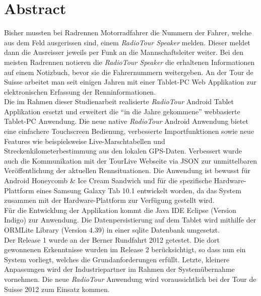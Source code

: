 \chapter*{Abstract}

Bisher mussten bei Radrennen Motorradfahrer die Nummern der Fahrer, welche aus dem Feld ausgerissen sind, einem \textit{RadioTour Speaker} melden. Dieser meldet dann die Ausreisser jeweils per Funk an die Mannschaftsleiter weiter. Bei den meisten Radrennen notieren die \textit{RadioTour Speaker} die erhaltenen Informationen auf einem Notizbuch, bevor sie die Fahrernummern weitergeben. An der Tour de Suisse arbeitet man seit einigen Jahren mit einer Tablet-PC Web Applikation zur elektronischen Erfassung der Renninformationen.
\\
Die im Rahmen dieser Studienarbeit realisierte \textit{RadioTour} Android Tablet Applikation ersetzt und erweitert die "`in die Jahre gekommene"' webbasierte Tablet-PC Anwendung. Die neue native \textit{RadioTour} Android Anwendung bietet eine einfachere Touchscreen Bedienung, verbesserte Importfunktionen sowie neue Features wie beispielsweise Live-Marschtabellen und Streckenkilometerbestimmung aus den lokalen GPS-Daten. Verbessert wurde auch die Kommunikation mit der TourLive Webseite via JSON zur unmittelbaren Veröffentlichung der aktuellen Rennsituationen. Die Anwendung ist bewusst für Android Honeycomb \& Ice Cream Sandwich und für die  spezifische Hardware-Plattform eines Samsung Galaxy Tab 10.1 entwickelt worden, da das System zusammen mit der Hardware-Plattform zur Verfügung gestellt wird.
\\
Für die Entwicklung der Applikation kommt die Java IDE Eclipse (Version Indigo) zur Anwendung. Die Datenpersistierung auf dem Tablet wird mithilfe der ORMLite Library (Version 4.39) in einer \gls{sqlite} Datenbank umgesetzt.
\\
Der Release 1 wurde an der Berner Rundfahrt 2012 getestet. Die dort gewonnenen Erkenntnisse wurden im Release 2 berücksichtigt, so dass nun ein System vorliegt, welches die Grundanforderungen erfüllt. Letzte, kleinere Anpassungen wird der Industriepartner im Rahmen der Systemübernahme vornehmen. Die neue \textit{RadioTour} Anwendung wird voraussichtlich bei der Tour de Suisse 2012 zum Einsatz kommen.

